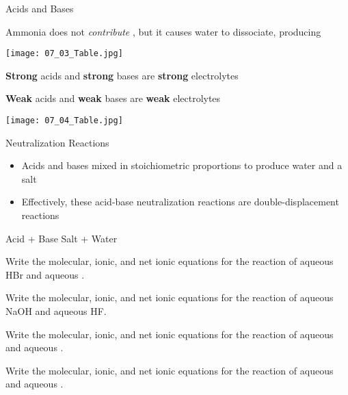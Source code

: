 \documentclass[handout]{beamer}
\begin{document}
\begin{frame}[allowframebreaks]{Acids and Bases}
\begin{itemize}
\begin{itemize}
					Ammonia does not \emph{contribute}
					, but it causes water to
					dissociate, producing 
			\end{itemize}
	\end{itemize}

	\begin{center}
		\texttt{[image: 07\_03\_Table.jpg]}
	\end{center}

	\bigskip

	\textbf{Strong} acids and \textbf{strong} bases are \textbf{strong}
	electrolytes

	\bigskip

	\textbf{Weak} acids and \textbf{weak} bases are \textbf{weak}
	electrolytes

	\framebreak

	\begin{center}
		\texttt{[image: 07\_04\_Table.jpg]}
	\end{center}

\end{frame}

\begin{frame}[allowframebreaks]{Neutralization Reactions}

	\begin{itemize}
		\item Acids and bases mixed in stoichiometric proportions to
			produce water and a salt
		\item Effectively, these acid-base neutralization reactions are
			double-displacement reactions
	\end{itemize}

	\bigskip

	\begin{center}

		\bigskip

		Acid + Base \ce{->} Salt + Water
	\end{center}

	\framebreak

	Write the molecular, ionic, and net ionic equations for the reaction of
	aqueous HBr and aqueous .
	\vfill

	\framebreak

	Write the molecular, ionic, and net ionic equations for the reaction of
	aqueous NaOH and aqueous HF.
	\vfill

	\framebreak

	Write the molecular, ionic, and net ionic equations for the reaction of
	aqueous  and aqueous .
	\vfill

	\framebreak

	Write the molecular, ionic, and net ionic equations for the reaction of
	aqueous  and aqueous .
	\vfill



\end{frame}
\end{document}
